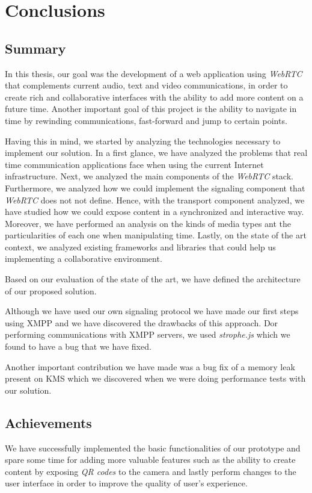 \chapter{Conclusions}
\label{chapter:conclusion}

\section{Summary}
\label{section:summary}
In this thesis, our goal was the development of a web application using \emph{WebRTC} that complements current audio, text and video communications, in order to create rich and collaborative interfaces with the ability to add more content on a future time. Another important goal of this project is the ability to navigate in time by rewinding communications, fast-forward and jump to certain points.

Having this in mind, we started by analyzing the technologies necessary to implement our solution. In a first glance, we have analyzed the problems that real time communication applications face when using the current Internet infrastructure. Next, we analyzed the main components of the \emph{WebRTC} stack. Furthermore, we analyzed how we could implement the signaling component that \emph{WebRTC} does not not define. Hence, with the transport component analyzed, we have studied how we could expose content in a synchronized and interactive way. Moreover, we have performed an analysis on the kinds of media types ant the particularities of each one when manipulating time. Lastly, on the state of the art context, we analyzed existing frameworks and libraries that could help us implementing a collaborative environment.

Based on our evaluation of the state of the art, we have defined the architecture of our proposed solution.

Although we have used our own signaling protocol we have made our first steps using \ac{XMPP} and we have discovered the drawbacks of this approach. Dor performing communications with \ac{XMPP} servers, we used \emph{strophe.js} which we found to have a bug that we have fixed.

Another important contribution we have made was a bug fix of a memory leak present on \ac{KMS} which we discovered when we were doing performance tests with our solution.

\section{Achievements}
\label{section:achievements}
	We have successfully implemented the basic functionalities of our prototype and spare some time for adding more valuable features such as the ability to create content by exposing \emph{QR codes} to the camera and lastly perform changes to the user interface in order to improve the quality of user's experience.

